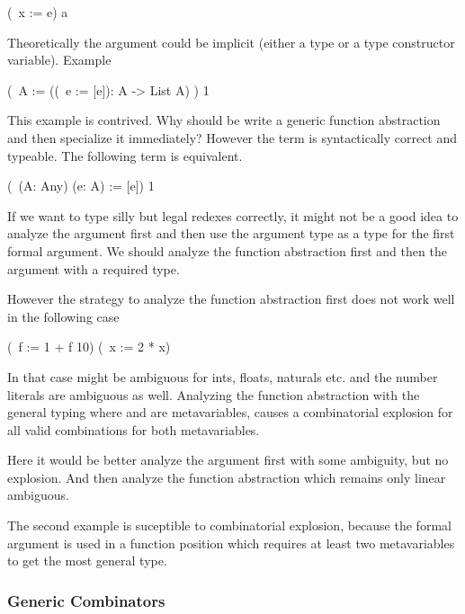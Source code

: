 \begin{alba}
    (\ x := e) a
\end{alba}

Theoretically the argument  could be implicit (either a type or a type
constructor variable). Example

\begin{alba}
    (\ A := ((\ e := [e]): A -> List A) ) 1
\end{alba}
%
This example is contrived. Why should be write a generic function abstraction
and then specialize it immediately? However the term is syntactically correct
and typeable. The following term is equivalent.

\begin{alba}
    (\ (A: Any) (e: A) := [e]) 1
\end{alba}

If we want to type silly but legal redexes correctly, it might not be a good
idea to analyze the argument first and then use the argument type as a type for
the first formal argument. We should analyze the function abstraction first and
then the argument with a required type.

However the strategy to analyze the function abstraction first does not work
well in the following case
%
\begin{alba}
    (\ f := 1 + f 10) (\ x := 2 * x)
\end{alba}
%
In that case \code{(+)} might be ambiguous for ints, floats, naturals etc. and
the number literals are ambiguous as well. Analyzing the function abstraction
with the general typing  where  and 
are metavariables, causes a combinatorial explosion for all valid combinations
for both metavariables.

Here it would be better analyze the argument first with some ambiguity, but no
explosion. And then analyze the function abstraction which remains only linear
ambiguous.

The second example is suceptible to combinatorial explosion, because the formal
argument  is used in a function position which requires at least two
metavariables to get the most general type.







\vskip 5mm
\subsubsection{Generic Combinators}



